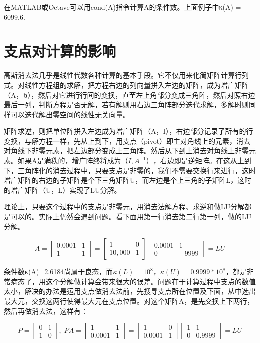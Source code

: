 在MATLAB或Octave可以用cond(A)指令计算A的条件数。上面例子中κ(A) = 6099.6.

\section{支点对计算的影响}

高斯消去法几乎是线性代数各种计算的基本手段。它不仅用来化简矩阵计算行列式。对线性方程组的求解，把方程右边的列向量拼入左边的矩阵，成为增广矩阵（A，\textbf{b}），然后对它进行行间的变换，直至左上角部分变成三角阵，然后对照右边最后一列，判断方程是否无解，若有解则用右边三角阵部分迭代求解，多解时则同样可以迭代解出零空间的线性无关向量。

矩阵求逆，则把单位阵拼入左边成为增广矩阵（A，I），右边部分记录了所有的行变换，与解方程一样，先从上到下，用支点（pivot）即主对角线上的元素，消去对角线下非零元素，把左边部分变成上三角阵。然后从下到上消去对角线上非零元素。如果A是满秩的，增广阵终将成为$ （I, A^{-1}） $，右边即是逆矩阵。在这从上到下，三角阵化的消去过程中，只要支点是非零的，我们不需要交换行来进行，这时增广矩阵的右边的子矩阵是个下三角矩阵U，而左边是个上三角的子矩阵L，这时的增广矩阵（U，L）实现了LU分解。

理论上，只要这个过程中的支点是非零元，用消去法解方程、求逆和做LU分解都是可以的。实际上仍然会遇到问题。看下面用第一行消去第二行第一列，做的LU分解。

\[A=\begin{bmatrix} 0.0001&1\\ 1&1 \end{bmatrix}=\begin{bmatrix} 1&0\\ 10,000&1 \end{bmatrix}\begin{bmatrix} 0.0001&1\\ 0&-9999 \end{bmatrix}=LU\]

条件数κ(A)=2.6184尚属于良态，而$ κ(L) =10^{8}，κ(U) =0.9999*10^{8} $，都是非常病态了，用这个分解做计算会带来很大的误差。问题在于计算过程中支点的数值太小，解决的办法是运用支点做消去法前，先搜寻支点所在位置及下面，从中选出最大元，交换这两行使得最大元在支点位置。对这个矩阵A，是先交换上下两行，然后再做消去法，这样有：

\[P=\begin{bmatrix} 0&1\\1&0\end{bmatrix},\;PA=\begin{bmatrix} 1&1\\0.0001&1 \end{bmatrix}=\begin{bmatrix}1&0\\0.0001&1\end{bmatrix}\begin{bmatrix} 1&1\\ 0&0.9999 \end{bmatrix}=LU\]

